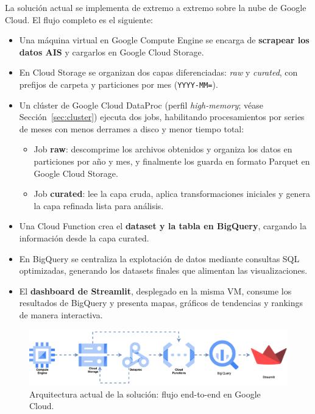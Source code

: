 \documentclass[10pt]{article}
\begin{document}
La solución actual se implementa de extremo a extremo sobre la nube de Google Cloud. El flujo completo es el siguiente:

\begin{itemize}
    \item Una máquina virtual en Google Compute Engine se encarga de \textbf{scrapear los datos AIS} y cargarlos en Google Cloud Storage. 
    \item En Cloud Storage se organizan dos capas diferenciadas: \textit{raw} y \textit{curated}, con prefijos de carpeta y particiones por mes (\texttt{YYYY-MM=}).
    \item Un clúster de Google Cloud DataProc (perfil \emph{high-memory}; véase Sección~\ref{sec:cluster}) ejecuta dos jobs, habilitando procesamientos por series de meses con menos derrames a disco y menor tiempo total:
    \begin{itemize}
        \item Job \textbf{raw}: descomprime los archivos obtenidos y organiza los datos en particiones por año y mes, y finalmente los guarda en formato Parquet en Google Cloud Storage.
        \item Job \textbf{curated}: lee la capa cruda, aplica transformaciones iniciales y genera la capa refinada lista para análisis.
    \end{itemize}
    \item Una Cloud Function crea el \textbf{dataset y la tabla en BigQuery}, cargando la información desde la capa curated.
    \item En BigQuery se centraliza la explotación de datos mediante consultas SQL optimizadas, generando los datasets finales que alimentan las visualizaciones.
    \item El \textbf{dashboard de Streamlit}, desplegado en la misma VM, consume los resultados de BigQuery y presenta mapas, gráficos de tendencias y rankings de manera interactiva.
\end{itemize}

\vspace{0.5cm}
\begin{figure}[H]
    \centering
    \includegraphics[width=\textwidth]{figures/arch/ArchitectureDiagram.png}
    \caption{Arquitectura actual de la solución: flujo end-to-end en Google Cloud.}
\end{figure}
\vspace{0.1cm}
\end{document}
